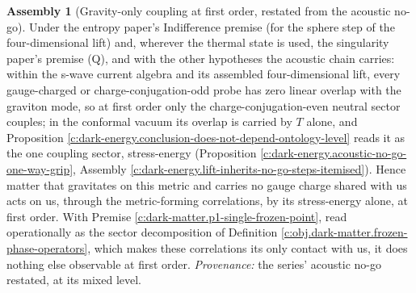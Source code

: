 \documentclass[11pt]{article}
\theoremstyle{definition}
\newtheorem{assembled}[theorem]{Assembly}
\theoremstyle{plain}
\newcommand{\changedmark}[2]{\marginpar{\raggedright\scriptsize\color{#1}#2}}
\begin{document}
\begin{assembled}[Gravity-only coupling at first order, restated from the acoustic no-go]\label{c:dark-matter.imported-gravity-only-coupling}
\changedmark{BurntOrange}{changed since the deposit}
Under the entropy paper's Indifference premise (for the sphere step of the four-dimensional lift) and, wherever the thermal state is used, the singularity paper's premise (Q), and with the other hypotheses the acoustic chain carries: within the s-wave current algebra and its assembled four-dimensional lift, every gauge-charged or charge-conjugation-odd probe has zero linear overlap with the graviton mode, so at first order only the charge-conjugation-even neutral sector couples; in the conformal vacuum its overlap is carried by $T$ alone, and Proposition \ref{c:dark-energy.conclusion-does-not-depend-ontology-level} reads it as the one coupling sector, stress-energy (Proposition \ref{c:dark-energy.acoustic-no-go-one-way-grip}, Assembly \ref{c:dark-energy.lift-inherits-no-go-steps-itemised}). Hence matter that gravitates on this metric and carries no gauge charge shared with us acts on us, through the metric-forming correlations, by its stress-energy alone, at first order. With Premise \ref{c:dark-matter.p1-single-frozen-point}, read operationally as the sector decomposition of Definition \ref{c:obj.dark-matter.frozen-phase-operators}, which makes these correlations its only contact with us, it does nothing else observable at first order. \emph{Provenance:} the series' acoustic no-go \cite[\S5]{ButlerT10} restated, at its mixed level.
\end{assembled}
\end{document}
